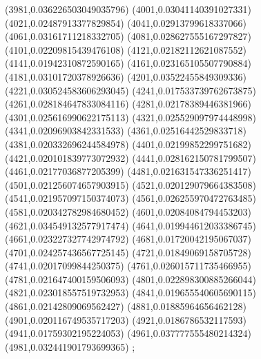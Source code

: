 {(3981,0.036226503049035796)
(4001,0.03041140391027331)
(4021,0.02487913377829854)
(4041,0.02913799618337066)
(4061,0.03161711218332705)
(4081,0.028627555167297827)
(4101,0.02209815439476108)
(4121,0.02182112621087552)
(4141,0.01942310872590165)
(4161,0.023165105507790884)
(4181,0.03101720378926636)
(4201,0.03522455849309336)
(4221,0.030524583606293045)
(4241,0.017533739762673875)
(4261,0.028184647833084116)
(4281,0.02178389446381966)
(4301,0.025616990622175113)
(4321,0.025529097974448998)
(4341,0.02096903842331533)
(4361,0.02516442529833718)
(4381,0.020332696244584978)
(4401,0.02199852299751682)
(4421,0.020101839773072932)
(4441,0.028162150781799507)
(4461,0.02177036877205399)
(4481,0.021631547336251417)
(4501,0.021256074657903915)
(4521,0.020129079664383508)
(4541,0.021957097150374073)
(4561,0.026255970472763485)
(4581,0.020342782984680452)
(4601,0.02084084794453203)
(4621,0.034549132577917474)
(4641,0.019944612033386745)
(4661,0.023227327742974792)
(4681,0.01720042195067037)
(4701,0.024257436567725145)
(4721,0.01849069158705728)
(4741,0.02017099844250375)
(4761,0.026015711735466955)
(4781,0.021647400159506093)
(4801,0.022898300885266044)
(4821,0.023018557519732953)
(4841,0.019655540605690115)
(4861,0.02142809069562427)
(4881,0.01885964656462128)
(4901,0.020116749535717203)
(4921,0.0186786532117593)
(4941,0.01759302195224053)
(4961,0.037777555480214324)
(4981,0.032441901793699365)
};
